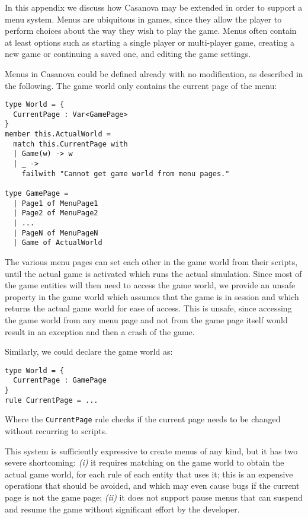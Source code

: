 In this appendix we discuss how Casanova may be extended in order to support a menu system. Menus are ubiquitous in games, since they allow the player to perform choices about the way they wish to play the game. Menus often contain at least options such as starting a single player or multi-player game, creating a new game or continuing a saved one, and editing the game settings.

Menus in Casanova could be defined already with no modification, as described in the following. 
The game world only contains the current page of the menu:

\begin{lstlisting}
type World = {
  CurrentPage : Var<GamePage>
}
member this.ActualWorld =
  match this.CurrentPage with
  | Game(w) -> w
  | _ -> 
  	failwith "Cannot get game world from menu pages."

type GamePage = 
  | Page1 of MenuPage1
  | Page2 of MenuPage2
  | ...
  | PageN of MenuPageN
  | Game of ActualWorld
\end{lstlisting}

The various menu pages can set each other in the game world from their scripts, until the actual game is activated which runs the actual simulation. Since most of the game entities will then need to access the game world, we provide an unsafe property in the game world which assumes that the game is in session and which returns the actual game world for ease of access. This is unsafe, since accessing the game world from any menu page and not from the game page itself would result in an exception and then a crash of the game.

Similarly, we could declare the game world as:

\begin{lstlisting}
type World = {
  CurrentPage : GamePage
}
rule CurrentPage = ...
\end{lstlisting}

Where the \texttt{CurrentPage} rule checks if the current page needs to be changed without recurring to scripts. 

This system is sufficiently expressive to create menus of any kind, but it has two severe shortcoming: \textit{(i)} it requires matching on the game world to obtain the actual game world, for each rule of each entity that uses it; this is an expensive operations that should be avoided, and which may even cause bugs if the current page is not the game page; \textit{(ii)} it does not support pause menus that can suspend and resume the game without significant effort by the developer.


